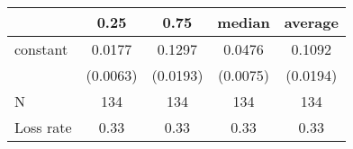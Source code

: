 \begin{tabular}{lcccc}
\hline
          &   0.25   &   0.75   &  median  & average   \\
\midrule
\midrule
constant  & 0.0177   & 0.1297   & 0.0476   & 0.1092    \\
          & (0.0063) & (0.0193) & (0.0075) & (0.0194)  \\
N         & 134      & 134      & 134      & 134       \\
Loss rate & 0.33     & 0.33     & 0.33     & 0.33      \\
\hline
\end{tabular}